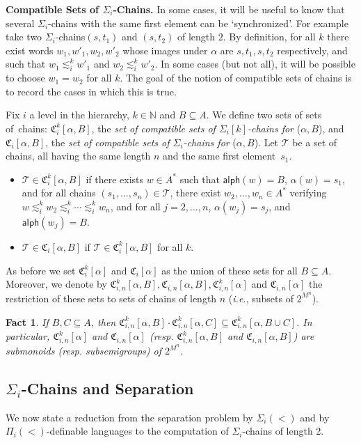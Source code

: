 \documentclass[envcountsame]{llncs}
\newcommand\nat{\ensuremath{\mathbb{N}}\xspace}
\newcommand\fCik{\ensuremath{\fC_i^k}\xspace}
\newcommand\fCi{\ensuremath{\fC_i}\xspace}
\newcommand\fCikn{\ensuremath{\fC_{i,n}^k}\xspace}
\newcommand\fCin{\ensuremath{\fC_{i,n}}\xspace}
\newcommand\Ts{\ensuremath{\mathcal{T}}\xspace}
\newcommand{\sic}[1]{\ensuremath{\Sigma_{#1}}\xspace}
\newcommand{\siw}[1]{\ensuremath{\Sigma_{#1}(<)}\xspace}
\newcommand{\piw}[1]{\ensuremath{\Pi_{#1}(<)}\xspace}
\newcommand\sieq[2]{\ensuremath{\lesssim^{#1}_{#2}}\xspace}
\newcommand\ksieq[1]{\sieq{k}{#1}}
\newcommand\content[1]{\ensuremath{\contentmorphism(#1)}}
\newcommand\contentmorphism{\ensuremath{\textsf{alph}}}
\newcommand\chains{chains\xspace}
\newcommand\qchains[1]{\ensuremath{\sic{#1}}-chains\xspace}
\newcommand\qChains[1]{\ensuremath{\sic{#1}}-Chains\xspace}
\newcommand\qpchains[2]{\ensuremath{\sic{#1}[#2]}-chains\xspace}
\newcommand\ichains{\qchains{i}}
\newcommand\iChains{\qChains{i}}
\newcommand\ikchains{\qpchains{i}{k}}
\newcommand\fC{\ensuremath{\mathfrak C}\xspace}
\newtheorem{fact}[theorem]{Fact}
\begin{document}
\medskip
\noindent
{\bf Compatible Sets of \iChains.} In some cases, it will be useful to
know that several \ichains with the same first element can be
`synchronized'. For example take two \ichains $(s,t_1)$ and $(s,t_2)$
of length $2$. By definition, for all $k$ there exist words
$w_1,w'_1,w_2,w'_2 $ whose images under $\alpha$ are $s,t_1,s,t_2$ respectively, and such that $w_1
\ksieq{i} w'_1$ and $w_2 \ksieq{i} w'_2$. In some cases (but not all),
it will be possible to choose $w_1 = w_2$ for all $k$. The goal of the
notion of compatible sets of \chains is to record the cases in which
this is true.

Fix $i$ a level in the hierarchy, $k \in \nat$ and $B \subseteq A$.
We define two sets of sets of~\chains:
$\fCik[\alpha,B]$, the \emph{set of compatible sets of \ikchains for}
($\alpha,B$), and
$\fCi[\alpha,B]$, the \emph{set of compatible sets of
  \ichains for} ($\alpha,B$).
Let \Ts be a set of \chains, all having the same
length $n$ and the same
first element~$s_1$.
\begin{itemize}
  \itemsep1ex
\item $\Ts \in \fCik[\alpha,B]$ if there exists $w \in A^*$ such
  that $\content{w} = B$, $\alpha(w) = s_1$, and for all \chains
  $(s_1,\dots,s_n) \in \Ts$, there exist $w_2,\dots,w_n \in A^*$
  verifying $w \ksieq{i} w_2 \ksieq{i} \cdots \ksieq{i} w_n$, and for all $j=2,\dots,n$,
  $\alpha(w_j)=s_j$, and $\content{w_j}=B$.
\item $\Ts \in \fCi[\alpha,B]$ if $\Ts \in
  \fCik[\alpha,B]$  for all $k$. 
\end{itemize}

As before we set $\fCik[\alpha]$ and $\fCi[\alpha]$ as the union
of these sets for all $B \subseteq A$. Moreover, we denote by
$\fCikn[\alpha,B],\fCin[\alpha,B],\fCikn[\alpha]$ and
$\fCin[\alpha]$ the restriction of these sets to sets of \chains of
length $n$ (\emph{i.e.}, subsets of $2^{M^n}$).

\begin{fact} \label{fct:setcomp} If $B,C\subseteq A$, then
  $\fCikn[\alpha,B]\cdot\fCikn[\alpha,C] \subseteq\fCikn[\alpha,B\cup C]$.  In
  particular, $\fCikn[\alpha]$ and $\fCin[\alpha]$ (resp. $\fCikn[\alpha,B]$
  and $\fCin[\alpha,B]$) are submonoids (resp. subsemigroups) of $2^{M^n}$.
\end{fact}


\subsection{\iChains and Separation}
We now state a reduction from the separation problem by $\siw{i}$ and by
$\piw{i}$-definable languages to the computation of \ichains of length 2.
\end{document}
